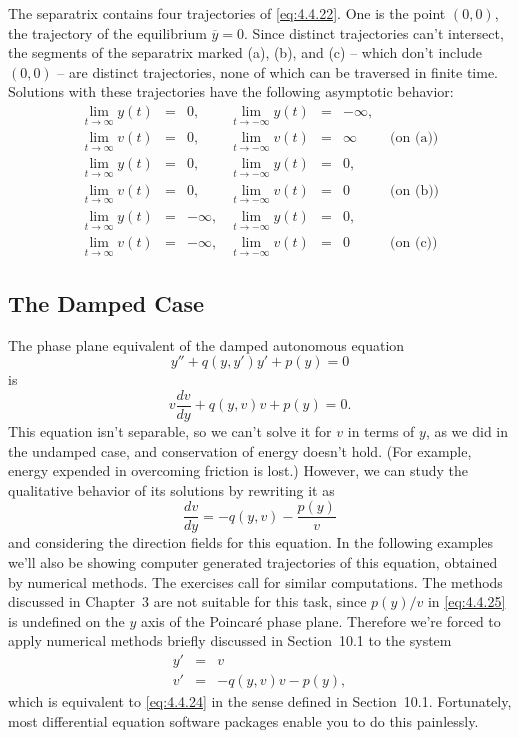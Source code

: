 \documentclass{ximera}
\begin{document}
\begin{example}
The separatrix contains four trajectories of \eqref{eq:4.4.22}. One is the
point $(0,0)$, the trajectory of the equilibrium $\overline{y}=0$.
Since distinct trajectories can't intersect, the segments of the
separatrix marked (a), (b), and (c) -- which don't include $(0,0)$ --
are distinct trajectories, none of which can be traversed in finite
time. Solutions with these trajectories have the following asymptotic
behavior:
$$
\begin{array}{llrllrl}
\lim_{t\rightarrow\infty}y(t)&=&0, &\lim_{t\rightarrow-\infty}y(t)&=&-\infty,\\
\lim_{t\rightarrow\infty}v(t)&=&0,
&\lim_{t\rightarrow-\infty}v(t)&=&\infty&
\mbox{ (on (a))}  \\
\lim_{t\rightarrow\infty}y(t)&=&0, &\lim_{t\rightarrow-\infty}y(t)&=&0,\\
\lim_{t\rightarrow\infty}v(t)&=&0,
&\lim_{t\rightarrow-\infty}v(t)&=&0&
\mbox{ (on (b))}  \\
\lim_{t\rightarrow\infty}y(t)&=&-\infty, &\lim_{t\rightarrow-\infty}y(t)&=&0,\\
\lim_{t\rightarrow\infty}v(t)&=&-\infty,
&\lim_{t\rightarrow-\infty}v(t)&=&0&
\mbox{ (on (c))}
\end{array}
$$
\end{example}


\subsection*{The Damped Case}

The phase plane equivalent of the damped autonomous equation
\begin{equation} \label{eq:4.4.24}
y''+q(y,y')y'+p(y)=0
\end{equation}
is
$$
v\frac{dv}{dy}+q(y,v)v+p(y)=0.
$$
This equation isn't  separable, so we can't solve it for $v$ in terms
of
$y$,
as we did in the undamped case, and conservation of energy doesn't
hold. (For example, energy expended in overcoming friction is lost.)
However, we can study the qualitative behavior of its solutions by
rewriting it as
\begin{equation} \label{eq:4.4.25}
\frac{dv}{dy}=-q(y,v)-\frac{p(y)}{v}
\end{equation}
and considering the direction fields for this equation. In the
following examples we'll also be showing computer generated
trajectories of this equation, obtained by numerical methods. The
exercises call for similar computations. The methods discussed in
Chapter~3
 are not suitable for this
task, since  $p(y)/v$ in \eqref{eq:4.4.25} is undefined on the $y$ axis
of the Poincar\'e phase plane. Therefore we're forced to apply
numerical methods briefly discussed in Section~10.1 to the
system
\begin{eqnarray*}
y'&=&v\\
v'&=&-q(y,v)v-p(y),
\end{eqnarray*}
which is equivalent to \eqref{eq:4.4.24} in the sense defined in
Section~10.1. Fortunately, most differential equation software
packages  enable you to do this painlessly.
\end{document}
